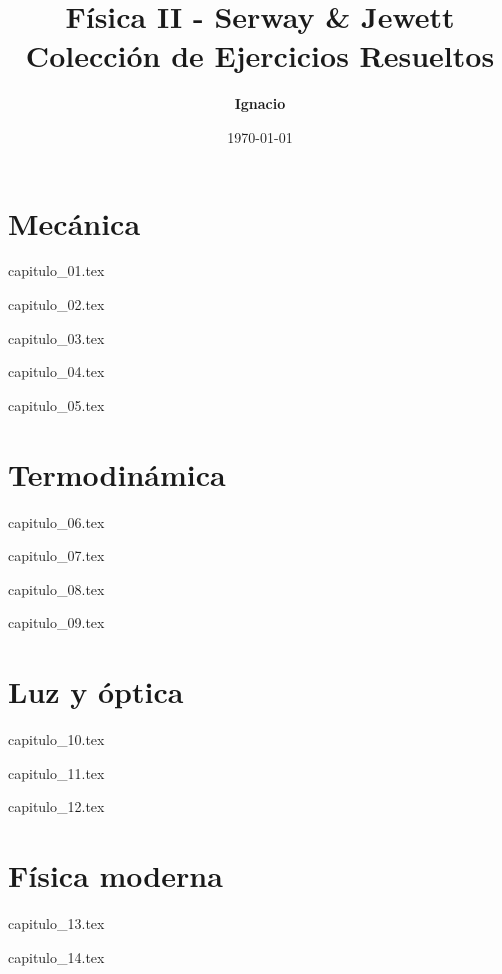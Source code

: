 \documentclass[11pt,spanish,oneside]{book}
\title{\textbf{Física II - Serway \& Jewett} \\ \Large Colección de Ejercicios Resueltos}
\author{\textbf{Ignacio}}
\date{\today}
\begin{document}
\maketitle

\tableofcontents

\part{Mecánica}

{capitulo_01.tex}

{capitulo_02.tex}

{capitulo_03.tex}

{capitulo_04.tex}

{capitulo_05.tex}

\part{Termodinámica}

{capitulo_06.tex}

{capitulo_07.tex}

{capitulo_08.tex}

{capitulo_09.tex}

\part{Luz y óptica}

{capitulo_10.tex}

{capitulo_11.tex}

{capitulo_12.tex}

\part{Física moderna}

{capitulo_13.tex}

{capitulo_14.tex}
\end{document}
